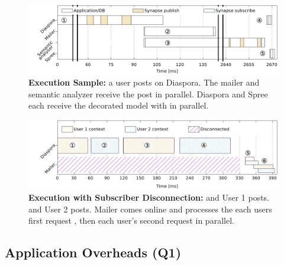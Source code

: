 \begin{figure}
  \centering
  \includegraphics[width=\linewidth]{figures/synapse/diaspora1.pdf}
  \caption{{\bf Execution Sample:}
      a user posts on Diaspora. The mailer  and semantic
     analyzer  receive the post in parallel. Diaspora  and Spree
      each receive the decorated model with in parallel.}
  \label{synapse:fig:diaspora1}
\end{figure}


\begin{figure}
  \centering
  \includegraphics[width=\linewidth]{figures/synapse/diaspora2.pdf}
  \caption{{\bf Execution with Subscriber Disconnection:}
     and  User 1 posts.  and  User 2 posts.
    Mailer comes online and processes the each users first request , then
  each user's second request  in parallel.}
  \label{synapse:fig:diaspora2}
\end{figure}

\subsection{Application Overheads (Q1)}
\label{synapse:sec:evaluation:overhead}

